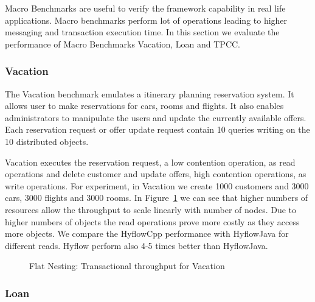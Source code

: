 \documentclass[12pt,english]{report}
\begin{document}
Macro Benchmarks are useful to verify the framework capability in real life applications. Macro benchmarks perform lot of operations leading to higher messaging and transaction execution time. In this section we evaluate the performance of Macro Benchmarks Vacation, Loan and TPCC.

\subsubsection{Vacation}

The Vacation benchmark emulates a itinerary planning reservation system. It allows user to make reservations for cars, rooms and flights. It also enables administrators to manipulate the users and update the currently available offers. Each reservation request or offer update request contain 10 queries writing on the 10 distributed objects. 

Vacation executes the reservation request, a low contention operation, as read operations and delete customer and update offers, high contention operations, as write operations. For experiment, in Vacation we create 1000 customers and 3000 cars, 3000 flights and 3000 rooms. In Figure~\ref{Fig:flatVacation} we can see  that higher numbers of resources allow the throughput to scale linearly with number of nodes. Due to higher numbers of objects the read operations prove more costly as they access more objects. We compare the HyflowCpp performance with HyflowJava for different reads. Hyflow perform also 4-5 times better than HyflowJava. 

\begin{figure}[H]
\centering
{}
\end{figure}
\begin{figure}[H]
\centering
{}
\end{figure}

\begin{figure}[H]
\centering
{}
\caption{Flat Nesting: Transactional throughput for Vacation}
\label{Fig:flatVacation}
\end{figure}

\subsubsection{Loan}
\end{document}
